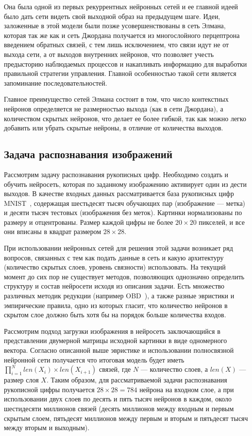 \documentclass[a4paper,14pt]{extarticle} %
\begin{document}
Она была одной из первых рекуррентных нейронных сетей и ее главной идеей было дать сети видеть свой выходной образ на предыдущем шаге. Идеи, заложенные в этой модели были позже усовершенствованы в сеть Элмана, которая так же как и сеть Джордана получается из многослойного перцептрона введением обратных связей, с тем лишь исключением, что связи идут не от выхода сети, а от выходов внутренних нейронов, что позволяет учесть предысторию наблюдаемых процессов и накапливать информацию для выработки правильной стратегии управления. Главной особенностью такой сети является запоминание последовательностей.

Главное преимущество сетей Элмана состоит в том, что число контекстных нейронов определяется не размерностью выхода (как в сети Джордана), а количеством скрытых нейронов, что делает ее более гибкой, так как можно легко добавить или убрать скрытые нейроны, в отличие от количества выходов.

\subsection{Задача распознавания изображений}
\hspace{\parindent} Рассмотрим задачу распознавания рукописных цифр. Необходимо создать и обучить нейросеть, которая по заданному изображению активирует один из дести выходов. В качестве входных данных рассматривается база рукописных цифр MNIST~\cite{lecun1998mnist}, содержащая шестьдесят тысяч обучающих пар (изображение --- метка) и десяти тысяч тестовых (изображения без меток). Картинки нормализованы по размеру и отцентрованы. Размер каждой цифры не более $20\times20$ пикселей, и все они вписаны в квадрат размером $28\times28$. 

При использовании нейронных сетей для решения этой задачи возникает ряд вопросов, связанных с тем как подать данные в сеть и какую архитектуру (количество скрытых слоев, уровень связности) использовать. На текущий момент до сих пор не существует методов, позволяющих однозначно определить структуру и состав нейросети исходя из описания задачи. Есть множество различных методик редукции (например OBD~\cite{chauvin1989advances}), а также разные эвристики и эмпирические правила, одно из которых гласит, что количество нейронов в скрытом слое должно быть хотя бы на порядок больше количества входов.

Рассмотрим подход загрузки изображения в нейросеть заключающийся в представлении двумерной матрицы исходной картинки в виде одномерного вектора. Согласно описанной выше эвристике и использовании полносвязной нейронной сети получается что итоговая модель будет иметь $\prod_{i=1}^{N} len(X_i)\times len(X_{i+1})$ связей, где $N$ --- количество слоев, а $len(X)$ --- размер слоя $X$. Таким образом, для рассматриваемой задачи распознавания рукописной цифры получается $28\times28=784$ нейрона на входном слое, а при использовании двух слоев по десять и пять тысяч нейронов в каждом, около шестидесяти миллионов связей (десять миллионов между входным и первым скрытым слоем, пятьдесят миллионов между первым и вторым и пятьдесят тысяч между вторым и выходным).
\end{document}
